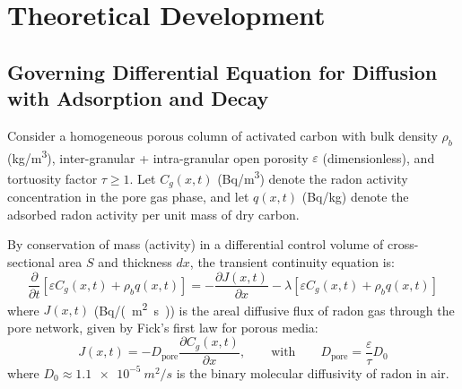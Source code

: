 \documentclass[11pt,a4paper]{article}
\begin{document}
\section{Theoretical Development}

\subsection{Governing Differential Equation for Diffusion with Adsorption and Decay}
Consider a homogeneous porous column of activated carbon with bulk density $\rho_b$ (\si{kg/m^3}), inter-granular + intra-granular open porosity $\varepsilon$ (dimensionless), and tortuosity factor $\tau \ge 1$. Let $C_g(x,t)$ (\si{Bq/m^3}) denote the radon activity concentration in the pore gas phase, and let $q(x,t)$ (\si{Bq/kg}) denote the adsorbed radon activity per unit mass of dry carbon.

By conservation of mass (activity) in a differential control volume of cross-sectional area $S$ and thickness $dx$, the transient continuity equation is:
\begin{equation}
    \frac{\partial}{\partial t}\left[ \varepsilon C_g(x,t) + \rho_b q(x,t) \right] = -\frac{\partial J(x,t)}{\partial x} - \lambda \left[ \varepsilon C_g(x,t) + \rho_b q(x,t) \right]
    \label{eq:continuity_general}
\end{equation}
where $J(x,t)$ (\si{Bq/(m^2.s)}) is the areal diffusive flux of radon gas through the pore network, given by Fick's first law for porous media:
\begin{equation}
    J(x,t) = -D_{\text{pore}} \frac{\partial C_g(x,t)}{\partial x}, \qquad \text{with} \qquad D_{\text{pore}} = \frac{\varepsilon}{\tau} D_0
    \label{eq:fick_pore}
\end{equation}
where $D_0 \approx \SI{1.1e-5}{m^2/s}$ is the binary molecular diffusivity of radon in air.
\end{document}
